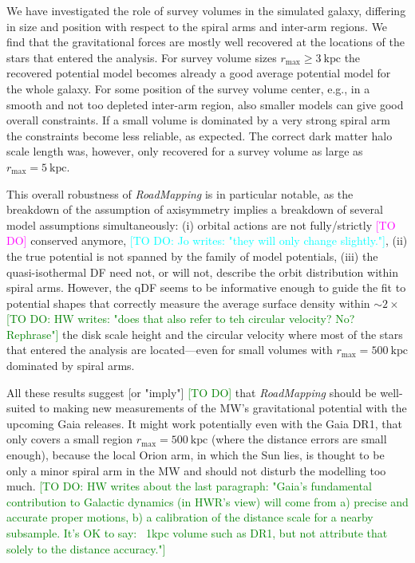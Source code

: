 \documentclass[iop,revtex4,numberedappendix,appendixfloats]{emulateapj}
\newcommand{\RM}{{\sl RoadMapping}}
\newcommand{\Wilma}[1]{\textcolor{Magenta}{#1}}
\newcommand{\HW}[1]{\textcolor{Green}{#1}}
\newcommand{\Jo}[1]{\textcolor{Cyan}{#1}}
\begin{document}
We have investigated the role of survey volumes in the simulated galaxy, differing in size and position with respect to the spiral arms and inter-arm regions. We find that the gravitational forces are mostly well recovered at the locations of the stars that entered the analysis. For survey volume sizes $r_\text{max} \geq 3~\text{kpc}$ the recovered potential model becomes already a good average potential model for the whole galaxy. For some position of the survey volume center, e.g., in a smooth and not too depleted inter-arm region, also smaller models can give good overall constraints. If a small volume is dominated by a very strong spiral arm the constraints become less reliable, as expected. The correct dark matter halo scale length was, however, only recovered for a survey volume as large as $r_\text{max}=5~\text{kpc}$. 

This overall robustness of \RM{} is in particular notable, as the breakdown of the assumption of axisymmetry implies a breakdown of several model assumptions simultaneously: (i) orbital actions are not fully/strictly \Wilma{[TO DO]} conserved anymore, \Jo{[TO DO: Jo writes: "they will only change slightly."]}, (ii) the true potential is not spanned by the family of model potentials, (iii) the quasi-isothermal DF need not, or will not, describe the orbit distribution within spiral arms. However, the qDF seems to be informative enough to guide the fit to potential shapes that correctly measure the average surface density within $\sim2 \times$ \HW{[TO DO: HW writes: "does that also refer to teh circular velocity? No? Rephrase"]} the disk scale height and the circular velocity where most of the stars that entered the analysis are located---even for small volumes with $r_\text{max}=500~\text{kpc}$ dominated by spiral arms.

All these results suggest [or "imply"] \HW{[TO DO]} that \RM{} should be well-suited to making new measurements of the MW's gravitational potential with the upcoming Gaia releases. It might work potentially even with the Gaia DR1, that only covers a small region $r_\text{max}=500~\text{kpc}$ (where the distance errors are small enough), because the local Orion arm, in which the Sun lies, is thought to be only a minor spiral arm in the MW and should not disturb the modelling too much. \HW{[TO DO: HW writes about the last paragraph: "Gaia's fundamental contribution to Galactic dynamics (in HWR's view) will come from a) precise and accurate proper motions, b) a calibration of the distance scale for a nearby subsample. It's OK to say: ~1kpc volume such as DR1, but not attribute that solely to the distance accuracy."]}
\end{document}
